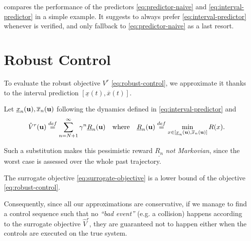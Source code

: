 \documentclass{article}
\begin{document}
 compares the performance of the predictors \eqref{eq:predictor-naive} and \eqref{eq:interval-predictor} in a simple example. It suggests to always prefer \eqref{eq:interval-predictor} whenever  is verified, and only fallback to \eqref{eq:predictor-naive} as a last resort.


\section{Robust Control}

\label{sec:control}
To evaluate the robust objective $V^r$ \eqref{eq:robust-control}, we approximate it thanks to the interval prediction $[\underline{x}(t), \overline{x}(t)]$.

\begin{definition}
	Let $\underline{x}_n(\mathbf{u}), \overline{x}_n(\mathbf{u})$ following the dynamics defined in \eqref{eq:interval-predictor} and
\begin{equation}
\label{eq:surrogate-objective} 
\hat{V}^r(\bu) \eqdef \sum_{n=N+1}^\infty \gamma^n \underline{R}_n(\bu)\quad\text{where}\quad\underline{R}_n(\bu) \eqdef \min_{x\in[\underline{x}_n(\bu), \overline{x}_n(\bu)]}  R(x). %
\end{equation}
\end{definition}
Such a substitution makes this pessimistic reward $\underline{R_n}$ \emph{not Markovian}, since the worst case is assessed over the whole past trajectory.

\begin{proposition}
\label{prop:lower-bound}
The surrogate objective  \eqref{eq:surrogate-objective} is a lower bound of the objective  \eqref{eq:robust-control}.
\end{proposition}
Consequently, since all our approximations are conservative, if we manage to find a control sequence such that no \textit{``bad event''} (e.g. a collision) happens according to the surrogate objective $\hat{V}^r$, they are guaranteed not to happen either when the controls are executed on the true system. 
\end{document}
